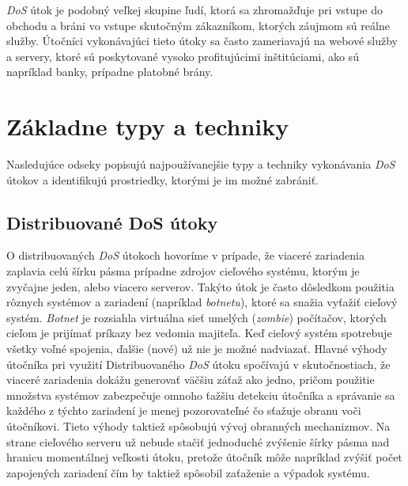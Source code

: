 \documentclass[
  printed, %
  table,   %
  lof,     %
  lot,     %
]{fithesis3}
\begin{document}
\textit{DoS} útok je podobný veľkej skupine ľudí, ktorá sa zhromažďuje pri vstupe do
obchodu a bráni vo vstupe skutočným zákazníkom, ktorých záujmom sú reálne služby.
Útočníci vykonávajúci tieto útoky sa často zameriavajú na webové služby a servery,
ktoré sú poskytované vysoko profitujúcimi inštitúciami, ako sú napríklad banky,
prípadne platobné brány.

\section{Základne typy a techniky}
Nasledujúce odseky popisujú najpoužívanejšie typy a techniky vykonávania \textit{DoS}
útokov a identifikujú prostriedky, ktorými je im možné zabrániť.

\subsection{Distribuované DoS útoky}
O distribuovaných \textit{DoS} útokoch hovoríme v prípade, že viaceré zariadenia zaplavia
celú šírku pásma prípadne zdrojov cieľového systému, ktorým je zvyčajne jeden, alebo viacero
serverov. Takýto útok je často dôsledkom použitia rôznych systémov a zariadení (napríklad
\textit{botnetu}), ktoré sa snažia vyťažiť cieľový systém. \textit{Botnet} je rozsiahla
virtuálna sieť umelých (\textit{zombie}) počítačov, ktorých cieľom je prijímať príkazy bez
vedomia majiteľa. Keď cieľový systém spotrebuje všetky voľné spojenia, ďalšie (nové) už nie
je možné nadviazať. Hlavné výhody útočníka pri využití Distribuovaného \textit{DoS} útoku
spočívajú v skutočnostiach, že viaceré zariadenia dokážu generovať väčšiu záťaž ako jedno,
pričom použitie množstva systémov zabezpečuje omnoho ťažšiu detekciu útočníka a správanie
sa každého z týchto zariadení je menej pozorovateľné čo sťažuje obranu voči útočníkovi.
Tieto výhody taktiež spôsobujú vývoj obranných mechanizmov. Na strane cieľového serveru už
nebude stačiť jednoduché zvýšenie šírky pásma nad hranicu momentálnej veľkosti útoku, pretože
útočník môže napríklad zvýšiť počet zapojených zariadení čím by taktiež spôsobil zaťaženie a
výpadok systému.
\end{document}
